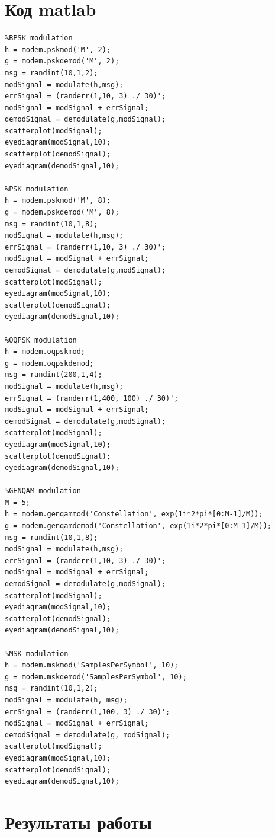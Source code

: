 \documentclass[10pt,a4paper]{report}
\begin{document}
\section{Код matlab}
\begin{verbatim}
%BPSK modulation
h = modem.pskmod('M', 2);
g = modem.pskdemod('M', 2);
msg = randint(10,1,2);
modSignal = modulate(h,msg);
errSignal = (randerr(1,10, 3) ./ 30)';
modSignal = modSignal + errSignal;
demodSignal = demodulate(g,modSignal);
scatterplot(modSignal);
eyediagram(modSignal,10);
scatterplot(demodSignal);
eyediagram(demodSignal,10);

%PSK modulation
h = modem.pskmod('M', 8);
g = modem.pskdemod('M', 8);
msg = randint(10,1,8);
modSignal = modulate(h,msg);
errSignal = (randerr(1,10, 3) ./ 30)';
modSignal = modSignal + errSignal;
demodSignal = demodulate(g,modSignal);
scatterplot(modSignal);
eyediagram(modSignal,10);
scatterplot(demodSignal);
eyediagram(demodSignal,10);

%OQPSK modulation
h = modem.oqpskmod;
g = modem.oqpskdemod;
msg = randint(200,1,4);
modSignal = modulate(h,msg);
errSignal = (randerr(1,400, 100) ./ 30)';
modSignal = modSignal + errSignal;
demodSignal = demodulate(g,modSignal);
scatterplot(modSignal);
eyediagram(modSignal,10);
scatterplot(demodSignal);
eyediagram(demodSignal,10);

%GENQAM modulation
M = 5;
h = modem.genqammod('Constellation', exp(1i*2*pi*[0:M-1]/M));
g = modem.genqamdemod('Constellation', exp(1i*2*pi*[0:M-1]/M));
msg = randint(10,1,8);
modSignal = modulate(h,msg);
errSignal = (randerr(1,10, 3) ./ 30)';
modSignal = modSignal + errSignal;
demodSignal = demodulate(g,modSignal);
scatterplot(modSignal);
eyediagram(modSignal,10);
scatterplot(demodSignal);
eyediagram(demodSignal,10);

%MSK modulation
h = modem.mskmod('SamplesPerSymbol', 10);
g = modem.mskdemod('SamplesPerSymbol', 10);
msg = randint(10,1,2);
modSignal = modulate(h, msg);
errSignal = (randerr(1,100, 3) ./ 30)';
modSignal = modSignal + errSignal;
demodSignal = demodulate(g, modSignal);
scatterplot(modSignal);
eyediagram(modSignal,10);
scatterplot(demodSignal);
eyediagram(demodSignal,10);
\end{verbatim}
\section{Результаты работы}
\end{document}
